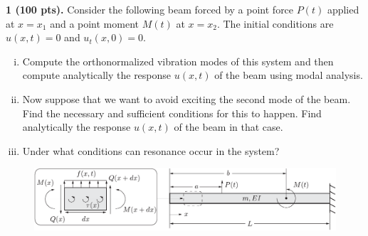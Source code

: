 \pagestyle{fancy}
\setlength{\headheight}{16pt}
\fancyhead{} %
\fancyfoot{} %
\fancyfoot[C]{\thepage}

\begin{problem}
    \textbf{1 (100 pts).} Consider the following beam forced by a point force $P(t)$ applied at $x = x_1$ and a point moment $M(t)$ at $x = x_2$.
    The initial conditions are $u(x, t) = 0$ and $u_t(x, 0) = 0$.
    \begin{enumerate}[(i)]
        \item {
            Compute the orthonormalized vibration modes of this system and then compute analytically the response $u(x, t)$ of the beam using modal analysis.
        }
        \item {
            Now suppose that we want to  avoid exciting the second mode of the beam.
            Find the necessary and sufficient conditions for this to happen. 
            Find analytically the response $u(x, t)$ of the beam in that case.
        }
        \item Under what conditions can resonance occur in the system?
    \end{enumerate} 
\end{problem}
\begin{figure}[!ht]
    \centering
    \includegraphics[width=\textwidth]{homework/hw4/assets/hw4_p1_setup.pdf}
\end{figure}

